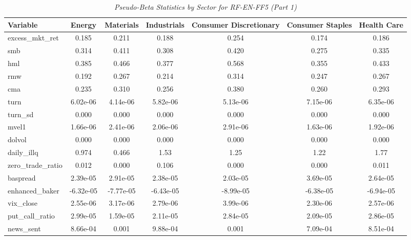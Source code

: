         \begin{table}[ht]
        \centering
        \caption{\textit{Pseudo-Beta Statistics by Sector for RF-EN-FF5 (Part 1)}}
        \label{tab:rfi_statistics_1}
        \begin{tabular}{lcccccc}
        \toprule
        \textbf{Variable} & \textbf{Energy} & \textbf{Materials} & \textbf{Industrials} & \textbf{Consumer Discretionary} & \textbf{Consumer Staples} & \textbf{Health Care} \\
        \midrule
        excess\_mkt\_ret & 0.185 & 0.211 & 0.188 & 0.254 & 0.174 & 0.186 \\
smb & 0.314 & 0.411 & 0.308 & 0.420 & 0.275 & 0.335 \\
hml & 0.385 & 0.466 & 0.377 & 0.568 & 0.355 & 0.433 \\
rmw & 0.192 & 0.267 & 0.214 & 0.314 & 0.247 & 0.267 \\
cma & 0.235 & 0.310 & 0.256 & 0.380 & 0.260 & 0.293 \\
turn & 6.02e-06 & 4.14e-06 & 5.82e-06 & 5.13e-06 & 7.15e-06 & 6.35e-06 \\
turn\_sd & 0.000 & 0.000 & 0.000 & 0.000 & 0.000 & 0.000 \\
mvel1 & 1.66e-06 & 2.41e-06 & 2.06e-06 & 2.91e-06 & 1.63e-06 & 1.92e-06 \\
dolvol & 0.000 & 0.000 & 0.000 & 0.000 & 0.000 & 0.000 \\
daily\_illq & 0.974 & 0.466 & 1.53 & 1.25 & 1.22 & 1.77 \\
zero\_trade\_ratio & 0.012 & 0.000 & 0.106 & 0.000 & 0.000 & 0.011 \\
baspread & 2.39e-05 & 2.91e-05 & 2.38e-05 & 2.03e-05 & 3.69e-05 & 2.64e-05 \\
enhanced\_baker & -6.32e-05 & -7.77e-05 & -6.43e-05 & -8.99e-05 & -6.38e-05 & -6.94e-05 \\
vix\_close & 2.55e-06 & 3.17e-06 & 2.79e-06 & 3.99e-06 & 2.30e-06 & 2.57e-06 \\
put\_call\_ratio & 2.99e-05 & 1.59e-05 & 2.11e-05 & 2.84e-05 & 2.09e-05 & 2.86e-05 \\
news\_sent & 8.66e-04 & 0.001 & 9.88e-04 & 0.001 & 7.09e-04 & 8.51e-04 \\
        \bottomrule
        \end{tabular}%
        \end{table}

